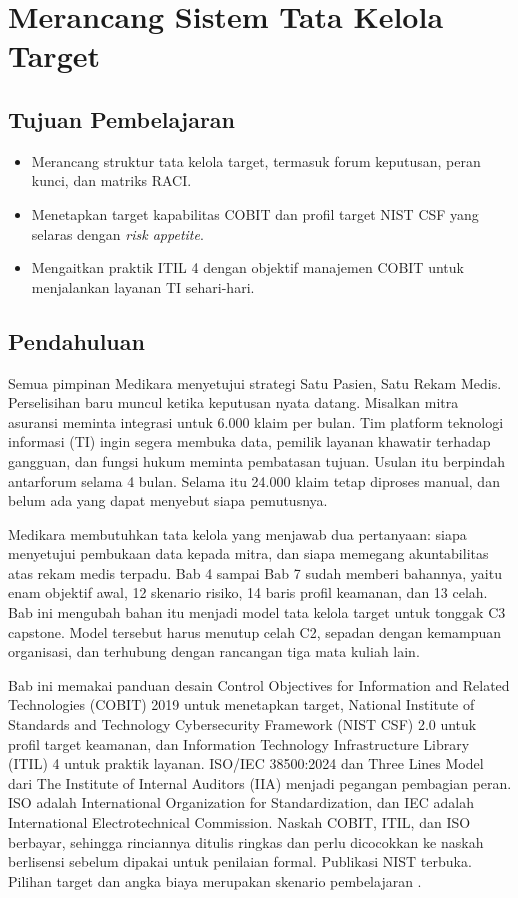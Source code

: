\chapter{Merancang Sistem Tata Kelola Target}

\section*{Tujuan Pembelajaran}
\begin{itemize}
  \item Merancang struktur tata kelola target, termasuk forum keputusan, peran kunci, dan
  matriks RACI.
  \item Menetapkan target kapabilitas COBIT dan profil target NIST CSF yang selaras dengan
  \textit{risk appetite}.
  \item Mengaitkan praktik ITIL 4 dengan objektif manajemen COBIT untuk menjalankan layanan TI
  sehari-hari.
\end{itemize}

\section{Pendahuluan}

Semua pimpinan Medikara menyetujui strategi Satu Pasien, Satu Rekam Medis. Perselisihan baru
muncul ketika keputusan nyata datang. Misalkan mitra asuransi meminta integrasi untuk 6.000
klaim per bulan. Tim platform teknologi informasi (TI) ingin segera membuka data, pemilik
layanan khawatir terhadap gangguan, dan fungsi hukum meminta pembatasan tujuan. Usulan itu
berpindah antarforum selama 4 bulan. Selama itu 24.000 klaim tetap diproses manual, dan belum
ada yang dapat menyebut siapa pemutusnya.

Medikara membutuhkan tata kelola yang menjawab dua pertanyaan: siapa menyetujui pembukaan data
kepada mitra, dan siapa memegang akuntabilitas atas rekam medis terpadu. Bab 4 sampai Bab 7
sudah memberi bahannya, yaitu enam objektif awal, 12 skenario risiko, 14 baris profil keamanan,
dan 13 celah. Bab ini mengubah bahan itu menjadi model tata kelola target untuk tonggak C3
capstone. Model tersebut harus menutup celah C2, sepadan dengan kemampuan organisasi, dan
terhubung dengan rancangan tiga mata kuliah lain.

Bab ini memakai panduan desain Control Objectives for Information and Related Technologies
(COBIT) 2019 untuk menetapkan target, National Institute of Standards and Technology
Cybersecurity Framework (NIST CSF) 2.0 untuk profil target keamanan, dan Information Technology
Infrastructure Library (ITIL) 4 untuk praktik layanan. ISO/IEC 38500:2024 dan Three Lines Model
dari The Institute of Internal Auditors (IIA) menjadi pegangan pembagian peran. ISO adalah
International Organization for Standardization, dan IEC adalah International Electrotechnical
Commission. Naskah COBIT, ITIL, dan ISO berbayar, sehingga rinciannya ditulis ringkas dan perlu
dicocokkan ke naskah berlisensi sebelum dipakai untuk penilaian formal. Publikasi NIST terbuka.
Pilihan target dan angka biaya merupakan skenario pembelajaran
\cite{cobit2019-design,nistcsf2,itil4,iso38500-2024,iia-tlm2026}.

